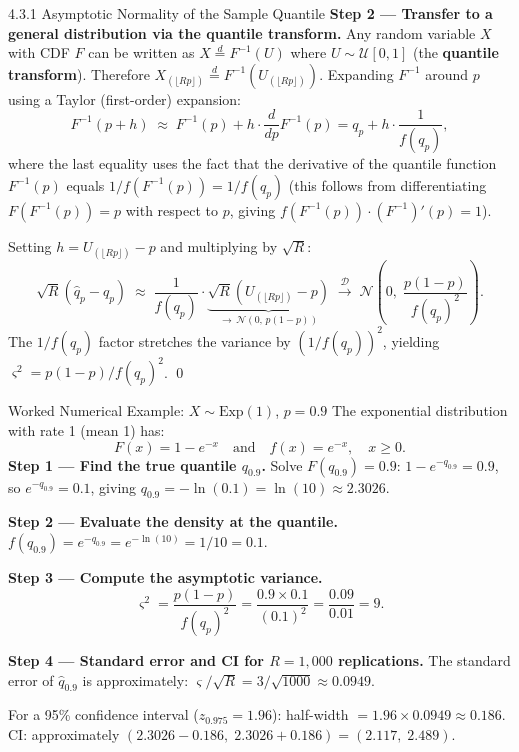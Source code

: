 \documentclass[aspectratio=169,10pt]{beamer}
\begin{document}
\begin{frame}[allowframebreaks]{4.3.1 Asymptotic Normality of the Sample Quantile}
\medskip
\textbf{Step 2 --- Transfer to a general distribution via the quantile transform.}
Any random variable $X$ with CDF $F$ can be written as $X \overset{d}{=} F^{-1}(U)$
where $U \sim \mathcal{U}[0,1]$ (the \textbf{quantile transform}).  Therefore
$X_{(\lfloor Rp \rfloor)} \overset{d}{=} F^{-1}(U_{(\lfloor Rp \rfloor)})$.
Expanding $F^{-1}$ around $p$ using a Taylor (first-order) expansion:
\[
  F^{-1}(p + h) \;\approx\; F^{-1}(p) + h \cdot \frac{d}{dp}F^{-1}(p)
    = q_p + h \cdot \frac{1}{f(q_p)},
\]
where the last equality uses the fact that the derivative of the quantile function
$F^{-1}(p)$ equals $1/f(F^{-1}(p)) = 1/f(q_p)$ (this follows from
differentiating $F(F^{-1}(p)) = p$ with respect to $p$, giving
$f(F^{-1}(p)) \cdot (F^{-1})'(p) = 1$).

Setting $h = U_{(\lfloor Rp \rfloor)} - p$ and multiplying by $\sqrt{R}$:
\[
  \sqrt{R}(\hat{q}_p - q_p)
    \;\approx\;
    \frac{1}{f(q_p)} \cdot \underbrace{\sqrt{R}(U_{(\lfloor Rp \rfloor)} - p)}_{\to\,\mathcal{N}(0,\,p(1-p))}
    \;\xrightarrow{\mathcal{D}}\;
    \mathcal{N}\!\left(0,\; \frac{p(1-p)}{f(q_p)^2}\right).
\]
The $1/f(q_p)$ factor stretches the variance by $(1/f(q_p))^2$, yielding
$\varsigma^2 = p(1-p)/f(q_p)^2$. \qed

\framebreak

\begin{exampleblock}{Worked Numerical Example: $X \sim \mathrm{Exp}(1)$, $p = 0.9$}
  The exponential distribution with rate 1 (mean 1) has:
  \[
    F(x) = 1 - e^{-x} \quad \text{and} \quad f(x) = e^{-x}, \quad x \geq 0.
  \]
  \textbf{Step 1 --- Find the true quantile $q_{0.9}$.}
  Solve $F(q_{0.9}) = 0.9$: $1 - e^{-q_{0.9}} = 0.9$, so
  $e^{-q_{0.9}} = 0.1$, giving
  $q_{0.9} = -\ln(0.1) = \ln(10) \approx 2.3026$.

  \textbf{Step 2 --- Evaluate the density at the quantile.}
  $f(q_{0.9}) = e^{-q_{0.9}} = e^{-\ln(10)} = 1/10 = 0.1$.

  \textbf{Step 3 --- Compute the asymptotic variance.}
  \[
    \varsigma^2 = \frac{p(1-p)}{f(q_p)^2}
      = \frac{0.9 \times 0.1}{(0.1)^2}
      = \frac{0.09}{0.01}
      = 9.
  \]

  \textbf{Step 4 --- Standard error and CI for $R = 1{,}000$ replications.}
  The standard error of $\hat{q}_{0.9}$ is approximately:
  $\varsigma/\sqrt{R} = 3/\sqrt{1000} \approx 0.0949$.

  For a 95\% confidence interval ($z_{0.975} = 1.96$):
  half-width $= 1.96 \times 0.0949 \approx 0.186$.
  CI: approximately $(2.3026 - 0.186,\; 2.3026 + 0.186) = (2.117,\; 2.489)$.


\end{exampleblock}
\end{frame}
\end{document}
